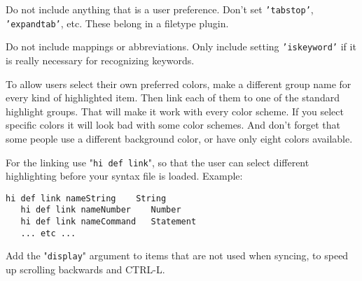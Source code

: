 Do not include anything that is a user preference.
Don't set \texttt{'tabstop'}, \texttt{'expandtab'}, etc.
These belong in a filetype plugin.

Do not include mappings or abbreviations.
Only include setting \texttt{'iskeyword'} if it is really necessary for recognizing keywords.

To allow users select their own preferred colors, make a different group name for every kind of highlighted item.
Then link each of them to one of the standard highlight groups.
That will make it work with every color scheme.
If you select specific colors it will look bad with some color schemes.
And don't forget that some people use a different background color, or have only eight colors available.

For the linking use "\texttt{hi def link}", so that the user can select different highlighting before your syntax file is loaded.
Example:

\begin{Verbatim}[samepage=true]
   hi def link nameString    String
   hi def link nameNumber    Number
   hi def link nameCommand   Statement
   ... etc ...
\end{Verbatim}

Add the "\texttt{display}" argument to items that are not used when syncing, to speed up scrolling backwards and CTRL-L.
\clearpage

